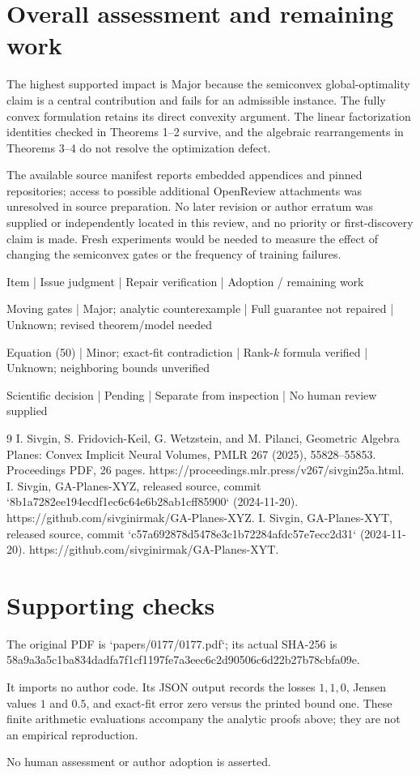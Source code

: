 \documentclass[10pt]{article}
\begin{document}
\section*{Overall assessment and remaining work}
The highest supported impact is Major because the semiconvex global-optimality claim is a central contribution and fails for an admissible instance. The fully convex formulation retains its direct convexity argument. The linear factorization identities checked in Theorems 1–2 survive, and the algebraic rearrangements in Theorems 3–4 do not resolve the optimization defect.\par
The available source manifest reports embedded appendices and pinned repositories; access to possible additional OpenReview attachments was unresolved in source preparation. No later revision or author erratum was supplied or independently located in this review, and no priority or first-discovery claim is made. Fresh experiments would be needed to measure the effect of changing the semiconvex gates or the frequency of training failures.\par
Item | Issue judgment | Repair verification | Adoption / remaining work\par
Moving gates | Major; analytic counterexample | Full guarantee not repaired | Unknown; revised theorem/model needed\par
Equation (50) | Minor; exact-fit contradiction | Rank-\(k\) formula verified | Unknown; neighboring bounds unverified\par
Scientific decision | Pending | Separate from inspection | No human review supplied\par
9 I. Sivgin, S. Fridovich-Keil, G. Wetzstein, and M. Pilanci, Geometric Algebra Planes: Convex Implicit Neural Volumes, PMLR 267 (2025), 55828–55853. Proceedings PDF, 26 pages. https://proceedings.mlr.press/v267/sivgin25a.html. I. Sivgin, GA-Planes-XYZ, released source, commit `8b1a7282ee194ecdf1ec6c64e6b28ab1cff85900` (2024-11-20). https://github.com/sivginirmak/GA-Planes-XYZ. I. Sivgin, GA-Planes-XYT, released source, commit `c57a692878d5478e3c1b72284afdc57e7ecc2d31` (2024-11-20). https://github.com/sivginirmak/GA-Planes-XYT.\par
\section*{Supporting checks}
The original PDF is `papers/0177/0177.pdf`; its actual SHA-256 is 58a9a3a5c1ba834dadfa7f1cf1197fe7a3eec6c2d90506c6d22b27b78cbfa09e.\par
It imports no author code. Its JSON output records the losses \(1,1,0\), Jensen values \(1\) and \(0.5\), and exact-fit error zero versus the printed bound one. These finite arithmetic evaluations accompany the analytic proofs above; they are not an empirical reproduction.\par
No human assessment or author adoption is asserted.\par
\end{document}
